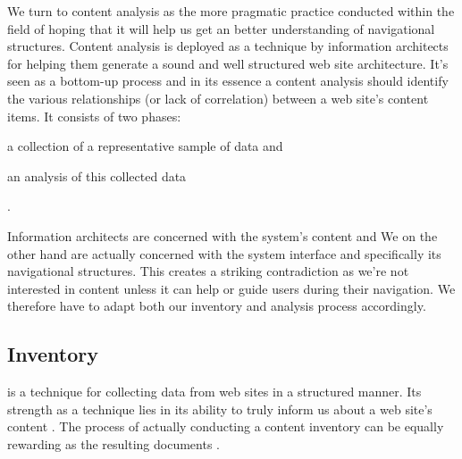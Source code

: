 We turn to content analysis as the more pragmatic practice conducted within
the field of %
 hoping that it will help us get an better understanding of navigational
structures.
Content analysis is deployed as a technique by information architects for
helping them generate a sound and well structured web site architecture.
It's seen as a bottom-up process and
in its essence a content analysis should identify the various
relationships (or lack of correlation) between a web site's content items.
It consists of two phases:
\begin{inparaenum}[(i)]
  \item a collection of a representative sample of data and
  \item an analysis of this collected data
\end{inparaenum}
\citep[]{morville06}.

Information architects are concerned with
the system's content and
We on the other hand are actually concerned with the system interface and
specifically its navigational structures. This creates a striking
contradiction as we're not interested in content unless it can help or
guide users during their navigation. We therefore have to adapt
both our inventory and analysis process accordingly.

\subsection{Inventory}

 is a technique for collecting data from web sites
in a structured manner. Its strength as a technique lies in its ability to
truly inform us about a web site's content \citep{wodtke02}. The process of
actually conducting a content inventory can be equally rewarding as the
resulting documents \citep{veen02}.

